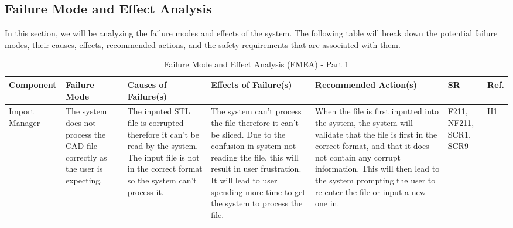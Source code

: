 \documentclass{article}
\begin{document}
\iffalse
\wss{Include your FMEA table here. This is the most important part of this document.}
\wss{The safety requirements in the table do not have to have the prefix SR.
The most important thing is to show traceability to your SRS. You might trace to
requirements you have already written, or you might need to add new
requirements.}
\wss{If no safety requirement can be devised, other mitigation strategies can be
entered in the table, including strategies involving providing additional
documentation, and/or test cases.}
\fi

\begin{landscape}
\section{Failure Mode and Effect Analysis}
In this section, we will be analyzing the failure modes and effects of the system. The following table will break down the potential failure modes, their causes, effects, recommended actions, and the safety requirements that are associated with them.
\begin{table}[H]
\centering
\caption{Failure Mode and Effect Analysis (FMEA) - Part 1}
\renewcommand{\arraystretch}{1.1} 
\footnotesize 
\begin{tabular}{|p{3cm}|p{3cm}|p{3.8cm}|p{3.8cm}|p{5.5cm}|p{2cm}|p{1cm}|}
\hline
\textbf{Component} & \textbf{Failure Mode} & \textbf{Causes of Failure(s)} & \textbf{Effects of Failure(s)} & \textbf{Recommended Action(s)} & \textbf{SR} & \textbf{Ref.} \\
\hline
Import Manager & The system does not process the CAD file correctly as the user is expecting. & \textbullet{} The inputed STL file is corrupted therefore it can't be read by the system.\newline \textbullet{} The input file is not in the correct format so the system can't process it.& \textbullet{} The system can't process the file therefore it can't be sliced. \newline \textbullet{} Due to the confusion in system not reading the file, this will result in user frustration. \newline \textbullet{} It will lead to user spending more time to get the system to process the file. & When the file is first inputted into the system, the system will validate that the file is first in the correct format, and that it does not contain any corrupt information. This will then lead to the system prompting the user to re-enter the file or input a new one in. & F211, NF211, SCR1, SCR9 & H1 \\

\end{tabular}
\end{table}
\end{landscape}
\end{document}
